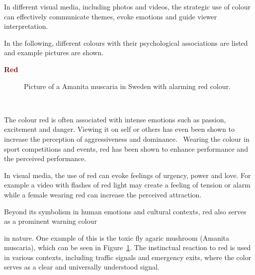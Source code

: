 \documentclass[../MasterThesis.tex]{subfiles}
\begin{document}
In different visual media, including photos and videos, the strategic use of colour can effectively communicate themes, evoke emotions and guide viewer interpretation.~\cite{cc_cg_1, cc_cg_2, colour, colour2}


In the following, different colours with their psychological associations are listed and example pictures are shown.



\textbf{\textcolor{Maroon}{Red}}

%
%

\begin{minipage}{0.5\textwidth}
	\begin{figure}[H]
		\begin{center}
			\caption[Picture of an Amanita muscaria in Sweden with alarming red colour.]{Picture of a Amanita muscaria in Sweden with alarming red colour.}
			\label{figure:red}
		\end{center}
	\end{figure}
 \hfill
\end{minipage}\begin{minipage}{0.05\textwidth}
	\ 
\end{minipage}\begin{minipage}{0.45\textwidth}
	The colour red is often associated with intense emotions such as passion, excitement and danger. Viewing it on self or others has even been shown to increase the perception of aggressiveness and dominance.~\cite{red_dominance} Wearing the colour in sport competitions and events, red has been shown to enhance performance and the perceived performance.~\cite{colour, red_sport}
	
	In visual media, the use of red can evoke feelings of urgency, power and love. For example a video with flashes of red light may create a feeling of tension or alarm while a female wearing red can increase the perceived attraction.~\cite{colour, red_romance}
	
	Beyond its symbolism in human emotions and cultural contexts, red also serves as a prominent warning colour 
	
\end{minipage}

\vspace*{-0.9em}
in nature. One example of this is the toxic fly agaric mushroom (Amanita muscaria), which can be seen in Figure~\ref{figure:red}.
The instinctual reaction to red is used in various contexts, including traffic signals and emergency exits, where the color serves as a clear and universally understood signal.
\end{document}
